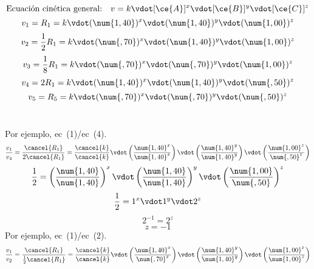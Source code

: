 \begin{frame}
\begin{overprint}
			$$
				\text{Ecuación cinética general:}\quad v=k\vdot[\ce{A}]^x\vdot[\ce{B}]^y\vdot[\ce{C}]^z
			$$
			\begin{equation}\label{eq:exp1}
				v_1=R_1 = k\vdot(\num{1,40})^x\vdot(\num{1,40})^y\vdot(\num{1,00})^z
			\end{equation}
			\begin{equation}\label{eq:exp2}
				v_2=\frac{1}{2}R_1 = k\vdot(\num{,70})^x\vdot(\num{1,40})^y\vdot(\num{1,00})^z
			\end{equation}
			\begin{equation}\label{eq:exp3}
				v_3=\frac{1}{8}R_1 = k\vdot(\num{,70})^x\vdot(\num{,70})^y\vdot(\num{1,00})^z
			\end{equation}
			\begin{equation}\label{eq:exp4}
				v_4=2R_1 = k\vdot(\num{1,40})^x\vdot(\num{1,40})^y\vdot(\num{,50})^z
			\end{equation}
			\begin{equation}\label{eq:exp5}
				v_5=R_5 = k\vdot(\num{,70})^x\vdot(\num{,70})^y\vdot(\num{,50})^z
			\end{equation}\\
	\end{overprint}
	\begin{overprint}
			 Por ejemplo, ec~(1)/ec~(4).
			$$
				\frac{v_1}{v_4}=\frac{\cancel{R_1}}{2\cancel{R_1}}=\frac{\cancel{k}}{\cancel{k}}\vdot\left(\frac{\num{1,40}^x}{\num{1,40}^x}\right)\vdot\left(\frac{\num{1,40}^y}{\num{1,40}^y}\right)\vdot\left(\frac{\num{1,00}^z}{\num{,50}^z}\right)
			$$
		\onslide<5>
			$$
				\frac{1}{2}=\left(\frac{\num{1,40}}{\num{1,40}}\right)^x\vdot\left(\frac{\num{1,40}}{\num{1,40}}\right)^y\vdot\left(\frac{\num{1,00}}{\num{,50}}\right)^z
			$$
		\onslide<6>
			$$
				\frac{1}{2}=1^x\vdot 1^y\vdot 2^z
			$$
		\onslide<7>
			$$
				2^{-1}=2^z
			$$
		\onslide<8>
			$$
				z=-1
			$$
		\onslide<9>
			 Por ejemplo, ec~(1)/ec~(2).
			$$
				\frac{v_1}{v_2}=\frac{\cancel{R_1}}{\frac{1}{2}\cancel{R_1}}=\frac{\cancel{k}}{\cancel{k}}\vdot\left(\frac{\num{1,40}^x}{\num{,70}^x}\right)\vdot\left(\frac{\num{1,40}^y}{\num{1,40}^y}\right)\vdot\left(\frac{\num{1,00}^z}{\num{1,00}^z}\right)
$$
\end{overprint}
\end{frame}
